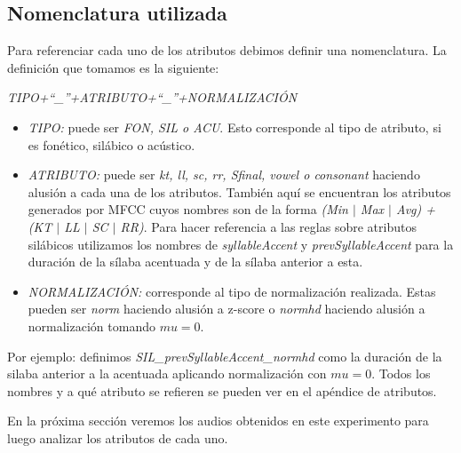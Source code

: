 \subsection{Nomenclatura utilizada}
Para referenciar cada uno de los atributos debimos definir una nomenclatura. La definición que tomamos es la siguiente:
\begin{center}
\textit{TIPO+``\_''+ATRIBUTO+``\_''+NORMALIZACIÓN} 
\end{center}

\begin{itemize}
  \item \emph{TIPO:} puede ser \emph{FON, SIL o ACU}. Esto corresponde al tipo de atributo, si es fonético, silábico o acústico.
  \item \emph{ATRIBUTO:} puede ser \emph{kt, ll, sc, rr, Sfinal, vowel o consonant} haciendo alusión a cada una de los atributos. También aquí se encuentran los atributos generados por MFCC cuyos nombres son de la forma \emph{(Min $|$ Max $|$ Avg) + (KT $|$ LL $|$ SC $|$ RR)}. Para hacer referencia a las reglas sobre atributos silábicos utilizamos los nombres de \emph{syllableAccent} y \emph{prevSyllableAccent} para la duración de la sílaba acentuada y de la sílaba anterior a esta.
  \item \emph{NORMALIZACIÓN:} corresponde al tipo de normalización realizada. Estas pueden ser \emph{norm} haciendo alusión a z-score o \emph{normhd} haciendo alusión a normalización tomando $mu=0$.
\end{itemize}
 
Por ejemplo: definimos \textit{SIL\_prevSyllableAccent\_normhd} como la duración de la silaba anterior a la acentuada aplicando normalización con $mu=0$. Todos los nombres y a qué atributo se refieren se pueden ver en el apéndice de atributos.

En la próxima sección veremos los audios obtenidos en este experimento para luego analizar los atributos de cada uno.